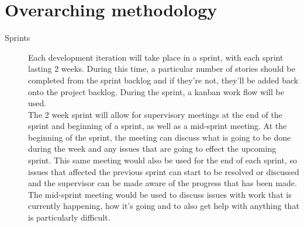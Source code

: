 \documentclass[11pt,fleqn,twoside]{article}
\begin{document}
\section{Overarching methodology}
\begin{description}
  \item[Sprints]
    Each development iteration will take place in a sprint, with each sprint lasting 2 weeks. During this time, a particular number of stories should be completed from the sprint backlog and if they're not, they'll be added back onto the project backlog. During the sprint, a kanban work flow will be used.\\
    
   The 2 week sprint will allow for supervisory meetings at the end of the sprint and beginning of a sprint, as well as a mid-sprint meeting. At the beginning of the sprint, the meeting can discuss what is going to be done during the week and any issues that are going to effect the upcoming sprint. This same meeting would also be used for the end of each sprint, so issues that affected the previous sprint can start to be resolved or discussed and the supervisor can be made aware of the progress that has been made.\\
   
   The mid-sprint meeting would be used to discuss issues with work that is currently happening, how it's going and to also get help with anything that is particularly difficult.\\
   

\end{description}
\end{document}
